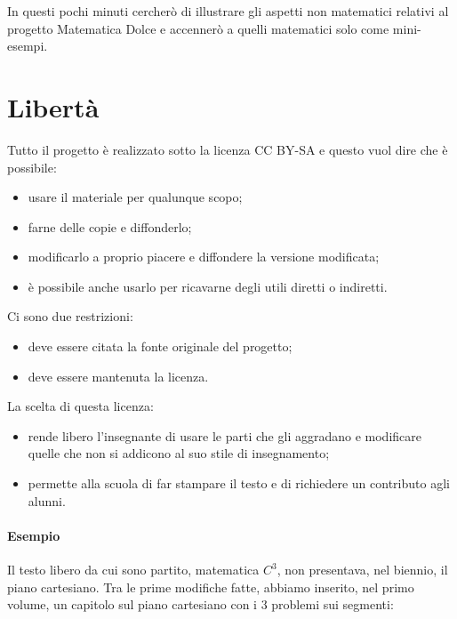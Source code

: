 \documentclass[a4paper,10pt]{article}
\begin{document}
In questi pochi minuti cercherò di illustrare gli aspetti non matematici 
relativi al progetto Matematica Dolce e accennerò a quelli matematici solo 
come mini-esempi.

\section{Libertà}

Tutto il progetto è realizzato sotto la licenza CC BY-SA e questo vuol dire 
che è possibile:
\begin{itemize} [noitemsep]
\item usare il materiale per qualunque scopo;
\item farne delle copie e diffonderlo;
\item modificarlo a proprio piacere e diffondere la versione modificata;
\item è possibile anche usarlo per ricavarne degli utili diretti o indiretti.
\end{itemize}

Ci sono due restrizioni:
\begin{itemize} [noitemsep]
\item deve essere citata la fonte originale del progetto;
\item deve essere mantenuta la licenza.
\end{itemize}

La scelta di questa licenza:
\begin{itemize} [noitemsep]
\item rende libero l'insegnante di usare le parti che 
gli aggradano e modificare quelle che non si addicono al suo stile di 
insegnamento;
\item permette alla scuola di far stampare il testo e di richiedere un 
contributo agli alunni.
\end{itemize}

\paragraph{Esempio} Il testo libero da cui sono partito, matematica \(C^3\), 
non presentava, nel biennio, il piano cartesiano. 
Tra le prime modifiche fatte, abbiamo inserito, nel primo volume, un 
capitolo sul piano cartesiano con i 3 problemi sui segmenti:
\end{document}
